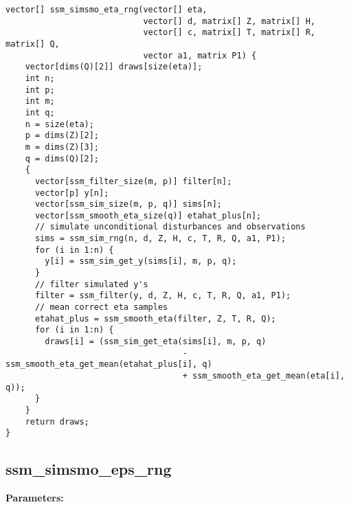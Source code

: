 \documentclass[]{book}
\begin{document}
\begin{verbatim}
vector[] ssm_simsmo_eta_rng(vector[] eta,
                            vector[] d, matrix[] Z, matrix[] H,
                            vector[] c, matrix[] T, matrix[] R, matrix[] Q,
                            vector a1, matrix P1) {
    vector[dims(Q)[2]] draws[size(eta)];
    int n;
    int p;
    int m;
    int q;
    n = size(eta);
    p = dims(Z)[2];
    m = dims(Z)[3];
    q = dims(Q)[2];
    {
      vector[ssm_filter_size(m, p)] filter[n];
      vector[p] y[n];
      vector[ssm_sim_size(m, p, q)] sims[n];
      vector[ssm_smooth_eta_size(q)] etahat_plus[n];
      // simulate unconditional disturbances and observations
      sims = ssm_sim_rng(n, d, Z, H, c, T, R, Q, a1, P1);
      for (i in 1:n) {
        y[i] = ssm_sim_get_y(sims[i], m, p, q);
      }
      // filter simulated y's
      filter = ssm_filter(y, d, Z, H, c, T, R, Q, a1, P1);
      // mean correct eta samples
      etahat_plus = ssm_smooth_eta(filter, Z, T, R, Q);
      for (i in 1:n) {
        draws[i] = (ssm_sim_get_eta(sims[i], m, p, q)
                                    - ssm_smooth_eta_get_mean(etahat_plus[i], q)
                                    + ssm_smooth_eta_get_mean(eta[i], q));
      }
    }
    return draws;
}
\end{verbatim}

\subsection{ssm\_simsmo\_eps\_rng}\label{ssmux5fsimsmoux5fepsux5frng}

\textbf{Parameters:}
\end{document}
